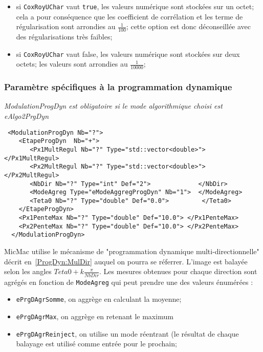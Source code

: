 \begin{itemize}
   \item si {\tt CoxRoyUChar} vaut {\tt true}, les valeurs num\'erique sont
         stock\'ees sur un octet; cela a pour cons\'equence que
	 les coefficient de corr\'elation et les terme de r\'egularisation
	 sont arrondies au $\frac{1}{100}$; cette option est donc
	 d\'econseill\'ee avec des r\'egularisations  tr\`es faibles;

   \item si {\tt CoxRoyUChar} vaut false, les valeurs num\'erique sont
         stock\'ees sur deux octets; les valeurs 
	 sont arrondies au $\frac{1}{10000}$;
\end{itemize}

\subsubsection{Param\`etre sp\'ecifiques \`a la programmation dynamique}

\emph{ModulationProgDyn est obligatoire si le mode
 algorithmique choisi est eAlgo2PrgDyn}

\begin{verbatim}
 <ModulationProgDyn Nb="?">
    <EtapeProgDyn  Nb="+">
       <Px1MultRegul Nb="?" Type="std::vector<double>"> </Px1MultRegul>
       <Px2MultRegul Nb="?" Type="std::vector<double>"> </Px2MultRegul>
       <NbDir Nb="?" Type="int" Def="2">             </NbDir>
       <ModeAgreg Type="eModeAggregProgDyn" Nb="1">  </ModeAgreg>
       <Teta0 Nb="?" Type="double" Def="0.0">         </Teta0>
    </EtapeProgDyn>
    <Px1PenteMax Nb="?" Type="double" Def="10.0"> </Px1PenteMax>
    <Px2PenteMax Nb="?" Type="double" Def="10.0"> </Px2PenteMax>
  </ModulationProgDyn>
\end{verbatim}

MicMac utilise le m\'ecanisme de 
"programmation dynamique multi-directionnelle"
d\'ecrit en~\ref{ProgDyn:MulDir} auquel on pourra se r\'eferrer.  
L'image est balay\'ee selon les
angles $Teta0 + k \frac{\pi}{NbDir}$. Les mesures obtenues pour
chaque direction sont
agr\'eg\'es en fonction de {\tt ModeAgreg} qui peut prendre
une des valeurs \'enum\'er\'ees :

\begin{itemize}
      \item {\tt ePrgDAgrSomme}, on aggr\`ege en calculant la  moyenne;
      \item {\tt ePrgDAgrMax},    on aggr\`ege en retenant le maximum
      \item {\tt ePrgDAgrReinject}, on utilise un mode r\'eentrant (le r\'esultat
            de chaque balayage est utilis\'e comme entr\'ee pour le prochain;
\end{itemize}

